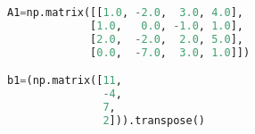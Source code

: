 \begin{lstlisting}[language=Python, style=jupycolors]
A1=np.matrix([[1.0, -2.0,  3.0, 4.0],
             [1.0,   0.0, -1.0, 1.0],
             [2.0,  -2.0,  2.0, 5.0],
             [0.0,  -7.0,  3.0, 1.0]])

b1=(np.matrix([11,
               -4,
               7,
               2])).transpose()

\end{lstlisting}